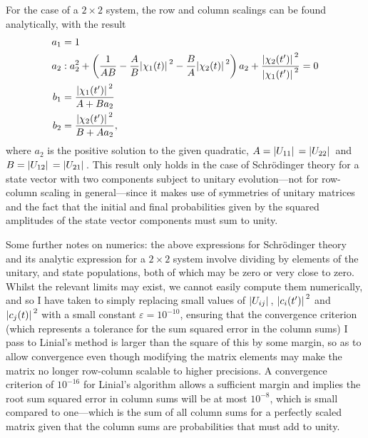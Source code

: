 For the case of a $2\times2$ system, the row and column scalings can be found analytically, with the result
\begin{align}
a_1 &= 1\\
a_2 &: a_2^2 + 
\left(\frac1{AB} - \frac AB \abs{\chi_1(t)}^2 - \frac BA \abs{\chi_2(t)}^2\right)a_2
+ \frac{\abs{\chi_2(t^\prime)}^2}{\abs{\chi_1(t^\prime)}^2} = 0\\
b_1 &= \frac{\abs{\chi_1(t^\prime)}^2}{A + B a_2}\\
b_2 &= \frac{\abs{\chi_2(t^\prime)}^2}{B + A a_2},
\end{align}
where $a_2$ is the positive solution to the given quadratic, $A = \abs{U_{11}} = \abs{U_{22}}$ and $B = \abs{U_{12}} = \abs{U_{21}}$. This result only holds in the case of Schr\"odinger theory for a state vector with two components subject to unitary evolution---not for row-column scaling in general---since it makes use of symmetries of unitary matrices and the fact that the initial and final probabilities given by the squared amplitudes of the state vector components must sum to unity.

Some further notes on numerics: the above expressions for Schr\"odinger theory and its analytic expression for a $2\times2$ system involve dividing by elements of the unitary, and state populations, both of which may be zero or very close to zero. Whilst the relevant limits may exist, we cannot easily compute them numerically, and so I have taken to simply replacing small values of $\abs{U_{ij}}$, $\abs{c_i(t^\prime)}^2$ and $\abs{c_j(t)}^2$ with a small constant $\varepsilon=10^{-10}$, ensuring that the convergence criterion (which represents a tolerance for the sum squared error in the column sums) I pass to Linial's method is larger than the square of this by some margin, so as to allow convergence even though modifying the matrix elements may make the matrix no longer row-column scalable to higher precisions. A convergence criterion of $10^{-16}$ for Linial's algorithm allows a sufficient margin and implies the root sum squared error in column sums will be at most $10^{-8}$, which is small compared to one---which is the sum of all column sums for a perfectly scaled matrix given that the column sums are probabilities that must add to unity.

